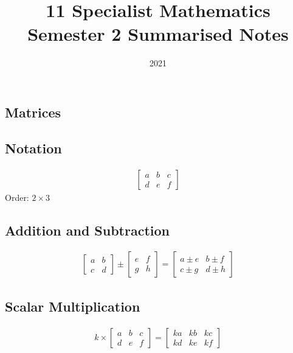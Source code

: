 \documentclass[10pt, a4paper, titlepage]{article}
\title{11 Specialist Mathematics Semester 2 Summarised Notes}
\author{}
\date{2021}
\begin{document}
	
\maketitle

\begin{multicols*}{3}
\section{Matrices}
\subsection{Notation}
\begin{align}
	\begin{bmatrix}
		a & b & c\\
		d & e & f
	\end{bmatrix}
\end{align}
Order: $2\times 3$

\dotfill
\subsection{Addition and Subtraction}
\begin{align}
	\begin{bmatrix}
		a & b\\
		c & d
	\end{bmatrix}
	\pm
	\begin{bmatrix}
		e & f\\
		g & h
	\end{bmatrix}
	=
	\begin{bmatrix}
		a\pm e & b\pm f\\
		c\pm g & d\pm h
	\end{bmatrix}
\end{align}
\dotfill
\subsection{Scalar Multiplication}
\begin{align}
	k\times
	\begin{bmatrix}
		a & b & c\\
		d & e & f
	\end{bmatrix}
	=
	\begin{bmatrix}
		ka & kb & kc\\
		kd & ke & kf
	\end{bmatrix}
\end{align}
\dotfill

\end{multicols*}
\end{document}
